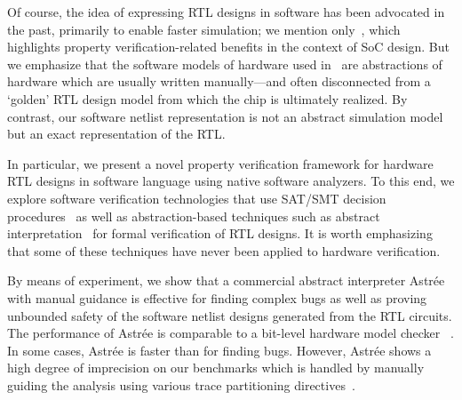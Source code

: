Of course, the idea of expressing RTL designs in software has been 
advocated in the past, primarily to enable faster simulation; we 
mention only~\cite{soc-keating}, which highlights property 
verification-related benefits in the context of SoC design.  
But we emphasize that the software models of hardware used 
in~\cite{soc-keating} are abstractions of hardware which are 
usually written manually---and often disconnected from a `golden' RTL design model from which the chip 
is ultimately realized.  By contrast, our software netlist representation 
is not an abstract simulation model but an exact representation 
of the RTL. 

In particular, we present a novel property verification framework 
for hardware RTL designs in software language using native 
software analyzers.  To this end, we explore software verification 
technologies that use SAT/SMT decision procedures~\cite{DBLP:conf/cav/BeyerK11,
2ls,cbmc.tacas:2004,DBLP:conf/tacas/HeizmannDGLMSP16} as well as abstraction-based 
techniques such as abstract interpretation~\cite{CC79} for formal verification 
of RTL designs.  It is worth emphasizing that some of these techniques 
have never been applied to hardware verification.  
%

By means of experiment, we show that a commercial abstract interpreter  
Astr{\'e}e with manual guidance is effective for finding complex bugs 
as well as proving unbounded safety of the software netlist designs 
generated from the RTL circuits.  The performance of Astr{\'e}e is 
comparable to a bit-level hardware model checker \ABC~\cite{abc}.  
%
In some cases, Astr{\'e}e is faster than \ABC for finding bugs. 
%
However, Astr{\'e}e shows a high degree of imprecision on our benchmarks 
which is handled by manually guiding the analysis using various trace 
partitioning directives~\cite{DBLP:journals/toplas/RivalM07}.  
%
